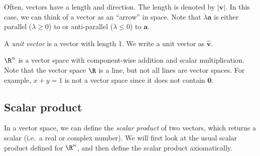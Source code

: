 \documentclass[a4paper]{article}
\begin{document}
Often, vectors have a length and direction. The length is denoted by $|\mathbf{v}|$. In this case, we can think of a vector as an ``arrow'' in space. Note that $\lambda\mathbf{a}$ is either parallel ($\lambda \ge 0$) to or anti-parallel ($\lambda \le 0$) to $\mathbf{a}$.
\begin{defi}
  A \emph{unit vector} is a vector with length 1. We write a unit vector as $\hat{\mathbf{v}}$.
\end{defi}

\begin{eg}
  $\R^n$ is a vector space with component-wise addition and scalar multiplication. Note that the vector space $\R$ is a line, but not all lines are vector spaces. For example, $x + y = 1$ is not a vector space since it does not contain $\mathbf{0}$.
\end{eg}

\subsection{Scalar product}
In a vector space, we can define the \emph{scalar product} of two vectors, which returns a scalar (i.e.\ a real or complex number). We will first look at the usual scalar product defined for $\R^n$, and then define the scalar product axiomatically.
\end{document}
